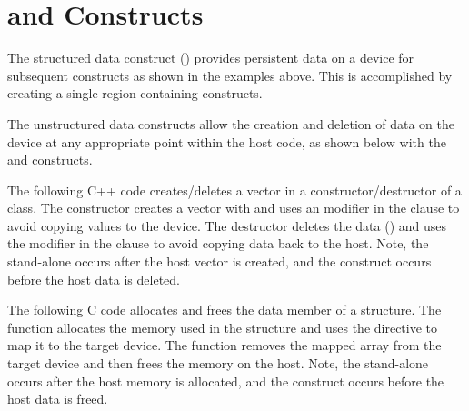 \section{ and  Constructs}
\label{sec:target_enter_exit_data}

The structured data construct () provides persistent data on a
device for subsequent  constructs as shown in the 
 examples above. This is accomplished by creating a single
 region containing  constructs.

The unstructured data constructs allow the creation and deletion of data on
the device at any appropriate point within the host code, as shown below 
with the  and  constructs.

The following C++ code creates/deletes a vector in a constructor/destructor 
of a class. The constructor creates a vector with 
and uses an  modifier in the  clause to avoid copying values
to the device. The destructor deletes the data ()
and uses the  modifier in the  clause to avoid copying data
back to the host. Note, the stand-alone  occurs
after the host vector is created, and the 
construct occurs before the host data is deleted.


The following C code allocates and frees the data member of a  structure.
The  function allocates the memory used in the structure and
uses the  directive to map it to the target device. The
 function removes the mapped array from the target device
and then frees the memory on the host.  Note, the stand-alone 
 occurs after the host memory is allocated, and the
 construct occurs before the host data is freed.


